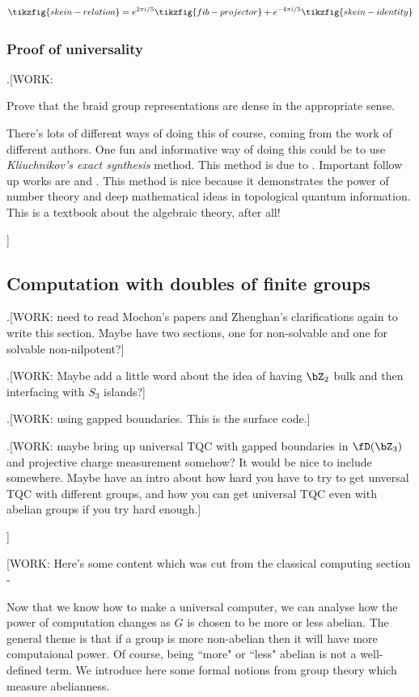 \begin{equation*}
\tikzfig{skein-relation} =  e^{2\pi i /5}\tikzfig{fib-projector} + e^{-4\pi i /5}\tikzfig{skein-identity}
\end{equation*}

\subsubsection{Proof of universality}

.[WORK:

Prove that the braid group representations are dense in the appropriate sense.

There's lots of different ways of doing this of course, coming from the work of different authors. One fun and informative way of doing this could be to use \textit{Kliuchnikov's exact synthesis} method. This method is due to \cite{kliuchnikov2014asymptotically}. Important follow up works are \cite{kliuchnikov2015frameworkA} and \cite{kliuchnikov2015frameworkB}. This method is nice because it demonstrates the power of number theory and deep mathematical ideas in topological quantum information. This is a textbook about the algebraic theory, after all!

]

\subsection{Computation with doubles of finite groups}

.[WORK: need to read Mochon's papers and Zhenghan's clarifications again to write this section. Maybe have two sections, one for non-solvable and one for solvable non-nilpotent?]

.[WORK: Maybe add a little word about the idea of having $\bZ_2$ bulk and then interfacing with $S_3$ islands?]

.[WORK: using gapped boundaries. This is the surface code.]

.[WORK: maybe bring up universal TQC with gapped boundaries in $\fD(\bZ_3)$ and projective charge measurement somehow? It would be nice to include somewhere. Maybe have an intro about how hard you have to try to get unversal TQC with different groups, and how you can get universal TQC even with abelian groups if you try hard enough.]

]

[WORK: Here's some content which was cut from the classical computing section - 

Now that we know how to make a universal computer, we can analyse how the power of computation changes as $G$ is chosen to be more or less abelian. The general theme is that if a group is more non-abelian then it will have more computaional power. Of course, being ``more" or ``less" abelian is not a well-defined term. We introduce here some formal notions from group theory which measure abelianness.

